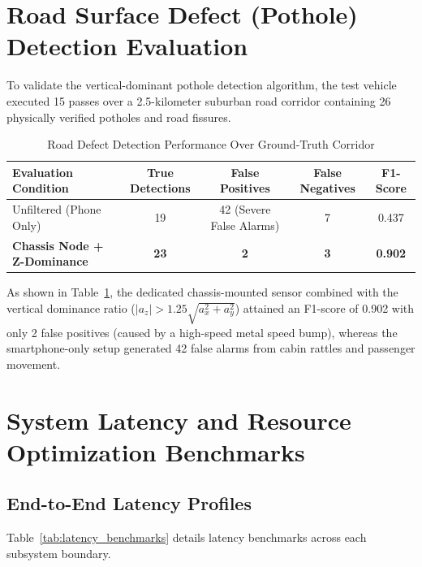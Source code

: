 \section{Road Surface Defect (Pothole) Detection Evaluation}
\label{sec:pothole_results}
To validate the vertical-dominant pothole detection algorithm, the test vehicle executed 15 passes over a 2.5-kilometer suburban road corridor containing 26 physically verified potholes and road fissures. 

\begin{table}[H]
\centering
\small
\caption{Road Defect Detection Performance Over Ground-Truth Corridor}
\label{tab:pothole_perf}
\begin{tabular}{lcccc}
\toprule
\textbf{Evaluation Condition} & \textbf{True Detections} & \textbf{False Positives} & \textbf{False Negatives} & \textbf{F1-Score} \\
\midrule
Unfiltered (Phone Only)        & 19 & 42 (Severe False Alarms) & 7 & 0.437 \\
\textbf{Chassis Node + Z-Dominance} & \textbf{23} & \textbf{2} & \textbf{3} & \textbf{0.902} \\
\bottomrule
\end{tabular}
\end{table}

As shown in Table~\ref{tab:pothole_perf}, the dedicated chassis-mounted sensor combined with the vertical dominance ratio ($|a_z| > 1.25 \sqrt{a_x^2 + a_y^2}$) attained an F1-score of 0.902 with only 2 false positives (caused by a high-speed metal speed bump), whereas the smartphone-only setup generated 42 false alarms from cabin rattles and passenger movement.

\section{System Latency and Resource Optimization Benchmarks}
\label{sec:benchmarks}

\subsection{End-to-End Latency Profiles}
Table~\ref{tab:latency_benchmarks} details latency benchmarks across each subsystem boundary.

